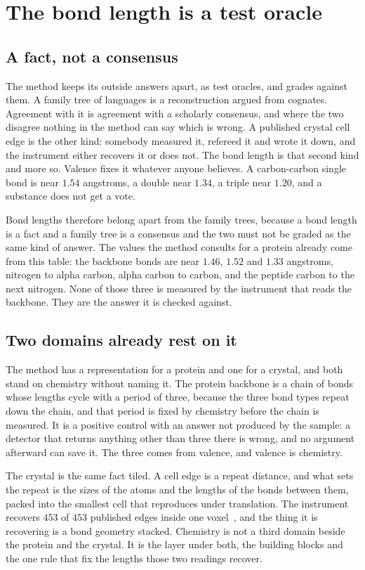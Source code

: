 \chapter{The bond length is a test oracle}

\section{A fact, not a consensus}

The method keeps its outside answers apart, as test oracles, and grades against them. A family tree
of languages is a reconstruction argued from cognates. Agreement with it is agreement with a
scholarly consensus, and where the two disagree nothing in the method can say which is wrong. A
published crystal cell edge is the other kind: somebody measured it, refereed it and wrote it down,
and the instrument either recovers it or does not. The bond length is that second kind and more so.
Valence fixes it whatever anyone believes. A carbon-carbon single bond is near $1.54$ angstroms, a
double near $1.34$, a triple near $1.20$, and a substance does not get a vote.

Bond lengths therefore belong apart from the family trees, because a bond length is a fact and a
family tree is a consensus and the two must not be graded as the same kind of answer. The values
the method consults for a protein already come from this table: the backbone bonds are near $1.46$,
$1.52$ and $1.33$ angstroms, nitrogen to alpha carbon, alpha carbon to carbon, and the peptide
carbon to the next nitrogen. None of those three is measured by the instrument that reads the
backbone. They are the answer it is checked against.

\section{Two domains already rest on it}

The method has a representation for a protein and one for a crystal, and both stand on chemistry
without naming it. The protein backbone is a chain of bonds whose lengths cycle with a period of
three, because the three bond types repeat down the chain, and that period is fixed by chemistry
before the chain is measured. It is a positive control with an answer not produced by the sample: a
detector that returns anything other than three there is wrong, and no argument afterward can save
it. The three comes from valence, and valence is chemistry.

The crystal is the same fact tiled. A cell edge is a repeat distance, and what sets the repeat is the
sizes of the atoms and the lengths of the bonds between them, packed into the smallest cell that
reproduces under translation. The instrument recovers $453$ of $453$ published edges inside one
voxel~\cite{src:Quigg-crystallography}, and the thing it is recovering is a bond geometry stacked.
Chemistry is not a third domain beside the protein and the crystal. It is the layer under both, the
building blocks and the one rule that fix the lengths those two readings recover.

